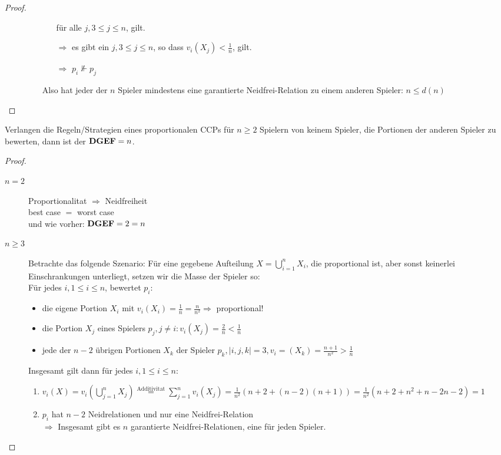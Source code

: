 \begin{proof}
\begin{enumerate}
\begin{description}
\begin{itemize}
                                              für alle $j,3\leq j\leq n$, gilt.
                          \item[$\Rightarrow$]es gibt ein $j,3\leq j\leq n$, so dass $v_i(X_j)<\frac{1}{n}$, gilt.
                          \item[$\Rightarrow$]$p_i\nVdash p_j$
                         \end{itemize}
                         Also hat jeder der $n$ Spieler mindestens eine garantierte Neidfrei-Relation zu einem anderen Spieler: $n\leq d(n)$  
        \end{description}
 \end{enumerate}
\end{proof}

\begin{defi}[lemma]
 Verlangen die Regeln/Strategien eines proportionalen CCPs für $n\geq2$ Spielern von keinem Spieler, die Portionen der anderen Spieler
 zu bewerten, dann ist der $\text{\textbf{DGEF}}=n$.
\end{defi}
\begin{proof}
 \begin{description}
  \item[$n=2$] Proportionalitat $\Rightarrow$ Neidfreiheit\\best case $=$ worst case\\und wie vorher: $\text{\textbf{DGEF}}=2=n$
  \item[$n\geq3$] Betrachte das folgende Szenario: Für eine gegebene Aufteilung $X=\bigcup\limits_{i=1}^nX_i$, die proportional ist, aber sonst
                  keinerlei Einschrankungen unterliegt, setzen wir die Masse der Spieler so: \\Für jedes $i, 1\leq i\leq n$, bewertet $p_i$:
                  \begin{itemize}
                   \item die eigene Portion $X_i$ mit $v_i(X_i)=\frac{1}{n}=\frac{n}{n^2}\Rightarrow$ proportional!
                   \item die Portion $X_j$ eines Spielers $p_j, j\neq i: v_i(X_j)=\frac{2}{n}<\frac{1}{n}$
                   \item jede der $n-2$ übrigen Portionen $X_k$ der Spieler $p_k, |{i,j,k}|=3, v_i=(X_k)=\frac{n+1}{n^2}>\frac{1}{n}$
                  \end{itemize}
                  Insgesamt gilt dann für jedes $i, 1\leq i\leq n$:
                  \begin{enumerate}
                   \item $v_i(X)=v_i(\bigcup\limits_{j=1}^nX_j)\stackrel{\text{Additivitat}}{=}\sum\limits_{j=1}^nv_i(X_j)=
                         \frac{1}{n^2}(n+2+(n-2)(n+1))=\frac{1}{n^2}(n+2+n^2+n-2n-2)=1$
                   \item $p_i$ hat $n-2$ Neidrelationen und nur eine Neidfrei-Relation\\$\Rightarrow$ Insgesamt gibt es $n$ garantierte 
                         Neidfrei-Relationen, eine für jeden Spieler.
                  \end{enumerate}
 \end{description}
\end{proof}

